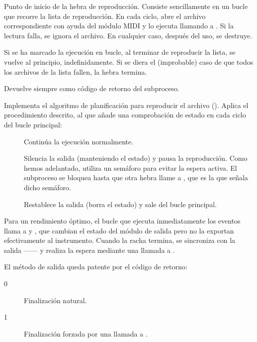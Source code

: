 \begin{description}[style=nextline]
	\item[\code{void* player\_run(void *arg)}]
	Punto de inicio de la hebra de reproducción. Consiste sencillamente en un bucle que recorre la lista de reproducción. En cada ciclo, abre el archivo correspondiente con ayuda del módulo \acrshort{MIDI} y lo ejecuta llamando a . Si la lectura falla, se ignora el archivo. En cualquier caso, después del uso, se destruye.
	
	Si se ha marcado la ejecución en bucle, al terminar de reproducir la lista, se vuelve al principio, indefinidamente. Si se diera el (improbable) caso de que todos los archivos de la lista fallen, la hebra termina.
	
	Devuelve siempre  como código de retorno del subproceso.
	
	\item[\code{int playscore(midifile\_t *file)}]
	
	Implementa el algoritmo de planificación para reproducir el archivo (). Aplica el procedimiento descrito, al que añade una comprobación de estado en cada ciclo del bucle principal:
	
	\begin{description}
		\item[] Continúa la ejecución normalmente.
		
		\item[] Silencia la salida (manteniendo el estado) y pausa la reproducción. Como hemos adelantado, utiliza un semáforo para evitar la espera activa. El subproceso se bloquea hasta que otra hebra llame a , que es la que señala dicho semáforo.
		
		\item[] Restablece la salida (borra el estado) y sale del bucle principal. 
	\end{description}
	
	Para un rendimiento óptimo, el bucle que ejecuta inmediatamente los eventos llama a  y , que cambian el estado del módulo de salida pero no la exportan efectivamente al instrumento. Cuando la racha termina, se sincroniza con la salida ------ y realiza la espera mediante una llamada a .

	El método de salida queda patente por el código de retorno:
	
	\begin{description}
		\item[0] Finalización natural.
		\item[1] Finalización forzada por una llamada a .
	\end{description}
	
\end{description}

